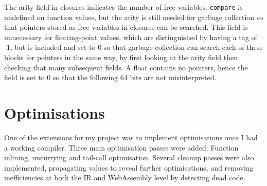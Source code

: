 The arity field in closures indicates the number of free variables. \verb|compare| is undefined on function values, but the arity is still needed for garbage collection so that pointers stored as free variables in closures can be searched. This field is unnecessary for floating-point values, which are distinguished by having a tag of -1, but is included and set to 0 so that garbage collection can search each of these blocks for pointers in the same way, by first looking at the arity field then checking that many subsequent fields. A float contains no pointers, hence the field is set to 0 so that the following 64 bits are not misinterpreted.





\section{Optimisations}

One of the extensions for my project was to implement optimisations once I had a working compiler. Three main optimisation passes were added: Function inlining, uncurrying and tail-call optimisation. Several cleanup passes were also implemented, propagating values to reveal further optimisations, and removing inefficiencies at both the IR and WebAssembly level by detecting dead code.

